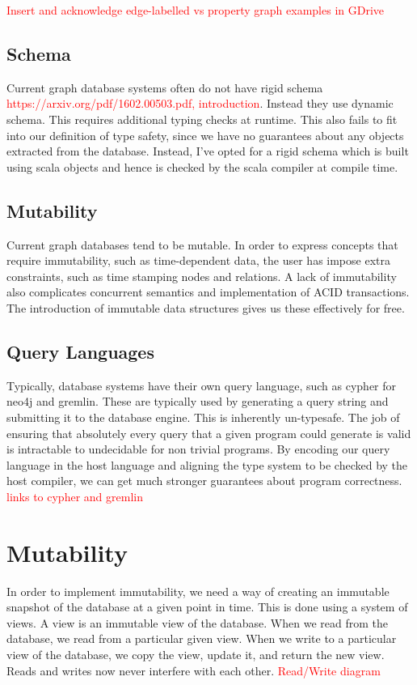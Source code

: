 \documentclass[12pt,a4paper,twoside,openright]{report}
\newcommand\todo[1]{\textcolor{red}{#1}}
\begin{document}
\todo{Insert and acknowledge edge-labelled vs property graph examples in GDrive}

\subsection{Schema}
Current graph database systems often do not have rigid schema \todo{https://arxiv.org/pdf/1602.00503.pdf, introduction}. Instead they use dynamic schema. This requires additional typing checks at runtime. This also fails to fit into our definition of type safety, since we have no guarantees about any objects extracted from the database. Instead, I’ve opted for a rigid schema which is built using scala objects and hence is checked by the scala compiler at compile time.
\subsection{Mutability}
Current graph databases tend to be mutable. In order to express concepts that require immutability, such as time-dependent data, the user has impose extra constraints, such as time stamping nodes and relations. A lack of immutability also complicates concurrent semantics and implementation of ACID transactions. The introduction of immutable data structures gives us these effectively for free.
\subsection{Query Languages}
Typically, database systems have their own query language, such as cypher for neo4j and gremlin. These are typically used by generating a query string and submitting it to the database engine. This is inherently un-typesafe. The job of ensuring that absolutely every query that a given program could generate is valid is intractable to undecidable for non trivial programs. By encoding our query language in the host language and aligning the type system to be checked by the host compiler, we can get much stronger guarantees about program correctness. \todo{links to cypher and gremlin}

\section{Mutability}
In order to implement immutability, we need a way of creating an immutable snapshot of the database at a given point in time. This is done using a system of views. A view is an immutable view of the database. When we read from the database, we read from a particular given view. When we write to a particular view of the database, we copy the view, update it, and return the new view. Reads and writes now never interfere with each other. \todo{Read/Write diagram}
\end{document}
